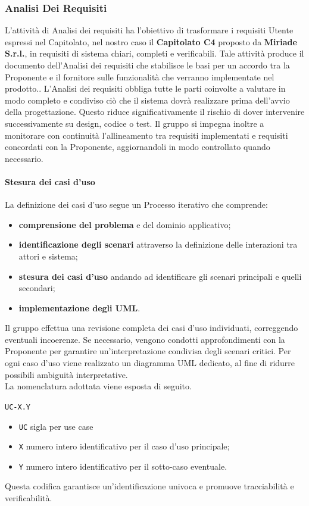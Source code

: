 \documentclass[a4paper,12pt]{article}
\begin{document}
\subsubsection{Analisi Dei Requisiti}
L'attività di Analisi dei requisiti ha l’obiettivo di trasformare i requisiti Utente espressi nel Capitolato, nel nostro caso il \textbf{Capitolato C4} proposto da \textbf{Miriade S.r.l.}, in requisiti di sistema chiari, completi e verificabili. 
Tale attività produce il documento dell'Analisi dei requisiti che stabilisce le basi per un accordo tra la Proponente e il fornitore sulle funzionalità che verranno implementate nel prodotto..
L’Analisi dei requisiti obbliga tutte le parti coinvolte a valutare in modo completo e condiviso ciò che il sistema dovrà realizzare prima dell’avvio della progettazione. Questo riduce significativamente il rischio di dover intervenire successivamente su design, codice o test.
Il gruppo si impegna inoltre a monitorare con continuità l’allineamento tra requisiti implementati e requisiti concordati con la Proponente, aggiornandoli in modo controllato quando necessario.

\paragraph{Stesura dei casi d'uso}

La definizione dei casi d’uso segue un Processo iterativo che comprende:
\begin{itemize}
    \item \textbf{comprensione del problema} e del dominio applicativo;
    \item \textbf{identificazione degli scenari} attraverso la definizione delle interazioni tra attori e sistema;
    \item \textbf{stesura dei casi d'uso} andando ad identificare gli scenari principali e quelli secondari;
    \item \textbf{implementazione degli UML}.
\end{itemize}

Il gruppo effettua una revisione completa dei casi d'uso individuati, correggendo eventuali incoerenze. Se necessario, vengono condotti approfondimenti con la Proponente per garantire un’interpretazione condivisa degli scenari critici.
Per ogni caso d’uso viene realizzato un diagramma UML dedicato, al fine di ridurre possibili ambiguità interpretative.\\

La nomenclatura adottata viene esposta di seguito.
\begin{center}
    \texttt{UC-X.Y}
\end{center}
\begin{itemize}
    \item \texttt{UC} sigla per use case
    \item \texttt{X} numero intero identificativo per il caso d'uso principale;
    \item \texttt{Y} numero intero identificativo per il sotto-caso eventuale.
\end{itemize}
Questa codifica garantisce un’identificazione univoca e promuove tracciabilità e verificabilità.
\end{document}

